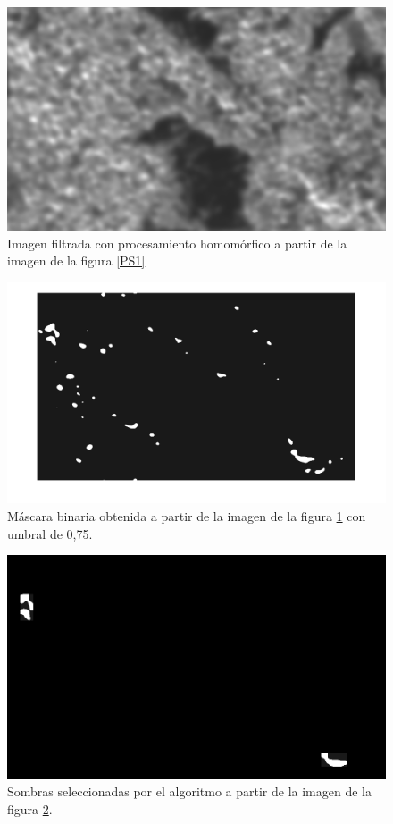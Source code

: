 \begin{figure}[h!]
    \includegraphics[width=\textwidth]{Imagenes/Homomorfico/PS1_filtered.png}
     \hfill
     \caption{Imagen filtrada con procesamiento homomórfico a partir de la imagen de la figura \ref{PS1}}
    \label{PS1 filtrada}
\end{figure}

\begin{figure}[h!]
    \includegraphics[width=\textwidth]{Imagenes/Homomorfico/PS1_bin.png}
     \hfill
     \caption{Máscara binaria obtenida a partir de la imagen de la figura \ref{PS1 filtrada} con umbral de 0,75.}
    \label{mascaraPS1}
\end{figure}

\begin{figure}[h!]
    \includegraphics[width=\textwidth]{Imagenes/Homomorfico/PS1_masked.png}
     \hfill
     \caption{Sombras seleccionadas por el algoritmo a partir de la imagen de la figura \ref{mascaraPS1}.}
    \label{seleccionadaPS1}
\end{figure}

